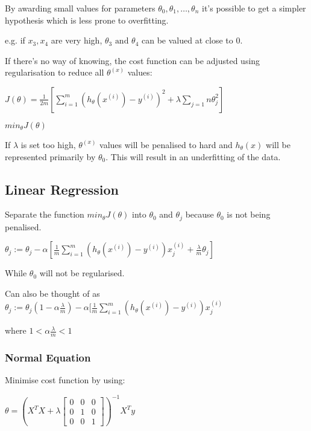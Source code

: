 \documentclass[12pt] {article}
\begin{document}
    By awarding small values for parameters $\theta_0,\theta_1,\dots,\theta_n$
    it's possible to get a simpler hypothesis which is less prone to 
    overfitting.

    e.g. if $x_3, x_4$ are very high, $\theta_3 \text{ and } \theta_4$ can
    be valued at close to 0. 

    If there's no way of knowing, the cost function can be adjusted using
    regularisation to reduce all $\theta^{(x)}$ values:

    $J(\theta) = \frac{1}{2m} [\displaystyle\sum_{i=1}^m 
    (h_\theta(x^{(i)}) - y^{(i)})^2 + \lambda \displaystyle\sum_{j=1}{n} 
    \theta_j^2]$

    $min_\theta J(\theta)$

    If $\lambda$ is set too high, $\theta^{(x)}$ values will be penalised to
    hard and $h_\theta(x)$ will be represented primarily by $\theta_0$. This
    will result in an underfitting of the data. 

  \subsection{Linear Regression}

    Separate the function $min_\theta J(\theta)$ into $\theta_0$ and $\theta_j$
    because $\theta_0$ is not being penalised.

    $\theta_j := \theta_j - \alpha [ \frac{1}{m} \displaystyle\sum_{i=1}^m
    (h_\theta(x^{(i)}) - y^{(i)})x_j^{(i)} + \frac{\lambda}{m}\theta_j]$

    While $\theta_0$ will not be regularised. 

    Can also be thought of as $\theta_j := \theta_j(1-\alpha\frac{\lambda}{m})
    - \alpha [ \frac{1}{m} \displaystyle\sum_{i=1}^m (h_\theta(x^{(i)}) - 
    y^{(i)})x_j^{(i)}$ 

    where $1 < \alpha\frac{\lambda}{m} < 1$

    \subsubsection{Normal Equation}

      Minimise cost function by using:

      $\theta = (X^TX + \lambda \begin{bmatrix} 0 & 0 & 0 \\  0 & 1 & 0 \\
      0 & 0 & 1 \end{bmatrix}) ^{-1} X^Ty$
\end{document}
